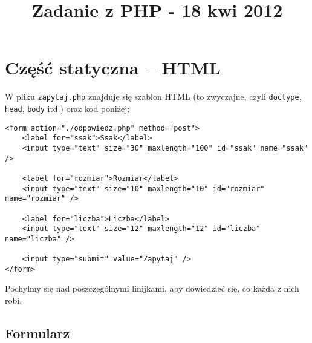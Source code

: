 \documentclass [a4paper, 10pt, oneside]{article}
\author{}
\title{Zadanie z PHP - 18 kwi 2012}
\begin{document}
\maketitle
\tableofcontents
\section{Część statyczna -- HTML}
W pliku \texttt{zapytaj.php} znajduje się szablon HTML (to zwyczajne, czyli \texttt{doctype}, \texttt{head}, \texttt{body} itd.) oraz kod poniżej:
\begin{lstlisting}
<form action="./odpowiedz.php" method="post">
    <label for="ssak">Ssak</label>
    <input type="text" size="30" maxlength="100" id="ssak" name="ssak" />

    <label for="rozmiar">Rozmiar</label>
    <input type="text" size="10" maxlength="10" id="rozmiar" name="rozmiar" />

    <label for="liczba">Liczba</label>
    <input type="text" size="12" maxlength="12" id="liczba" name="liczba" />

    <input type="submit" value="Zapytaj" />
</form>
\end{lstlisting}
Pochylmy się nad poszczególnymi linijkami, aby dowiedzieć się, co każda z nich robi.
\subsection{Formularz}
\end{document}
